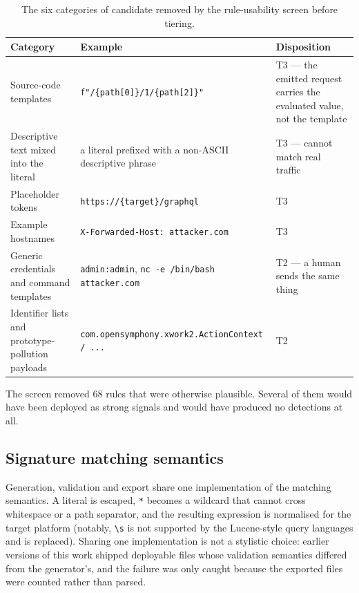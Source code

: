 \documentclass[11pt]{article}
\begin{document}
\begin{table}[t]
\centering
\caption{The six categories of candidate removed by the rule-usability screen before tiering.}
\label{tab:screen}
\begin{tabularx}{\textwidth}{@{}L{0.22\textwidth}Y L{0.30\textwidth}@{}}
\toprule
\textbf{Category} & \textbf{Example} & \textbf{Disposition} \\
\midrule
Source-code templates & \texttt{f"/\{path[0]\}/1/\{path[2]\}"} & T3 --- the emitted request carries the evaluated value, not the template \\
Descriptive text mixed into the literal & a literal prefixed with a non-ASCII descriptive phrase & T3 --- cannot match real traffic \\
Placeholder tokens & \texttt{https://\{target\}/graphql} & T3 \\
Example hostnames & \texttt{X-Forwarded-Host: attacker.com} & T3 \\
Generic credentials and command templates & \texttt{admin:admin}, \texttt{nc -e /bin/bash attacker.com} & T2 --- a human sends the same thing \\
Identifier lists and prototype-pollution payloads & \texttt{com.opensymphony.\allowbreak xwork2.\allowbreak ActionContext / ...} & T2 \\
\bottomrule
\end{tabularx}
\end{table}

The screen removed 68 rules that were otherwise plausible. Several of them would have been
deployed as strong signals and would have produced no detections at all.

\subsection{Signature matching semantics}
\label{sec:matching}

Generation, validation and export share one implementation of the matching semantics. A
literal is escaped, \texttt{*} becomes a wildcard that cannot cross whitespace or a path
separator, and the resulting expression is normalised for the target platform (notably,
\texttt{\textbackslash s} is not supported by the Lucene-style query languages and is
replaced). Sharing one implementation is not a stylistic choice: earlier versions of this work
shipped deployable files whose validation semantics differed from the generator's, and the
failure was only caught because the exported files were counted rather than parsed.
\end{document}
